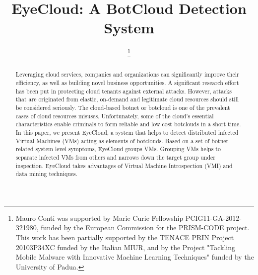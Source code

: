 \documentclass[conference]{IEEEtran}
\begin{document}
\title{EyeCloud: A BotCloud Detection System}
\author{
\and
{}
\thanks{Mauro Conti was supported by Marie Curie Fellowship PCIG11-GA-2012-321980, funded by the European Commission for the PRISM-CODE project. This work has been partially supported by the TENACE PRIN Project 20103P34XC funded by the Italian MIUR, and by the Project "Tackling Mobile Malware with Innovative Machine Learning Techniques" funded by the University of Padua.}
\and
{}

}

\maketitle
\begin{abstract}
Leveraging cloud services, companies and organizations can significantly improve their efficiency, as well as building novel business opportunities. A significant research effort has been put in protecting cloud tenants against external attacks. However, attacks that are originated from elastic, on-demand and legitimate cloud resources should still be considered seriously. The cloud-based botnet or botcloud is one of the prevalent cases of cloud resources misuses. Unfortunately, some of the cloud's essential characteristics enable criminals to form reliable and low cost botclouds in a short time. In this paper, we present EyeCloud, a system that helps to detect distributed infected Virtual Machines (VMs) acting as elements of botclouds. Based on a set of botnet related system level symptoms, EyeCloud groups VMs. Grouping VMs helps to separate infected VMs from others and narrows down the target group under inspection. EyeCloud takes advantages of Virtual Machine Introspection (VMI) and data mining techniques. 
\end{abstract} 
\end{document}
